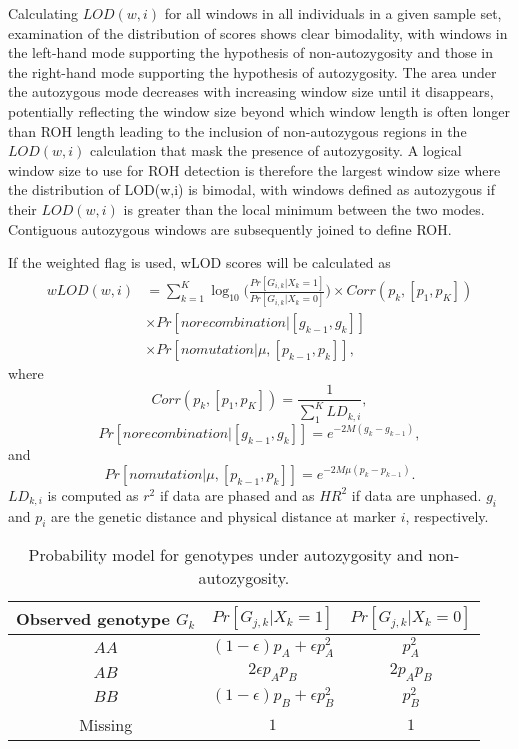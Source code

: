 \documentclass[12pt]{article}%
\begin{document}
Calculating $LOD(w,i)$ for all windows in all individuals in a given sample set, examination of the distribution of scores shows clear bimodality, with windows in the left-hand mode supporting the hypothesis of non-autozygosity and those in the right-hand mode supporting the hypothesis of autozygosity. The area under the autozygous mode decreases with increasing window size until it disappears, potentially reflecting the window size beyond which window length is often longer than ROH length leading to the inclusion of non-autozygous regions in the $LOD(w,i)$ calculation that mask the presence of autozygosity. A logical window size to use for ROH detection is therefore the largest window size where the distribution of LOD(w,i) is bimodal, with windows defined as autozygous if their $LOD(w,i)$ is greater than the local minimum between the two modes. Contiguous autozygous windows are subsequently joined to define ROH.

If the weighted flag is used, wLOD scores will be calculated as
\begin{align}
wLOD(w,i) &= \sum_{k=1}^K \log_{10}\Big(\frac{Pr[G_{i,k} | X_k = 1]}{Pr⁡[G_{i,k} |X_k=0]}\Big)\times Corr(p_k,[p_1,p_K]) \\ 
&\times Pr[norecombination|[g_{k-1},g_{k}]] \\ 
&\times Pr[nomutation|\mu,[p_{k-1},p_k]],
\end{align}
where
\begin{equation}
Corr(p_k,[p_1,p_K]) = \frac{1}{\sum_1^KLD_{k,i}},
\end{equation}
\begin{equation}
Pr[norecombination|[g_{k-1},g_{k}]] = e^{-2M(g_k-g_{k-1})},
\end{equation}
and
\begin{equation}
Pr[nomutation|\mu,[p_{k-1},p_k]] = e^{-2M\mu(p_k-p_{k-1})}.
\end{equation}
$LD_{k,i}$ is computed as $r^2$ if data are phased and as $HR^2$ if data are unphased. $g_i$ and $p_i$ are the genetic distance and physical distance at marker $i$, respectively.


\begin{table}[h]
\centering
\caption{ Probability model for genotypes under autozygosity and non-autozygosity. }
\begin{tabular}{|c|cc|}
\hline
Observed genotype $G_k$ & $Pr⁡[G_{j,k}|X_k=1]$ & $Pr⁡[G_{j,k}|X_k=0]$\\
\hline
$AA$ & $(1-\epsilon)p_A+\epsilon p_A^2$ & $p_A^2$\\
$AB$ & $2\epsilon p_Ap_B$ & $2p_Ap_B$\\
$BB$ & $(1-\epsilon)p_B+\epsilon p_B^2$ & $p_B^2$\\
Missing & $1$ & $1$\\
\hline
\end{tabular}
\end{table}
\end{document}
